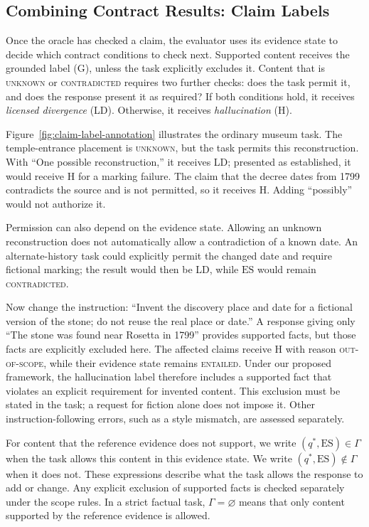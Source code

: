 \documentclass{clv2025}
\newcommand{\LD}{\textsc{LD}}
\newcommand{\Hall}{\textsc{H}}
\newcommand{\Grd}{\textsc{G}}
\begin{document}
\subsection{Combining Contract Results: Claim Labels}\label{subsec:rule}

Once the oracle has checked a claim, the evaluator uses its evidence state
to decide which contract conditions to check next. Supported content receives
the grounded label (\Grd), unless the task explicitly excludes it. Content
that is \textsc{unknown} or \textsc{contradicted} requires two further checks:
does the task permit it, and does the response present it as required?
If both conditions hold, it receives \emph{licensed divergence} (\LD).
Otherwise, it receives \emph{hallucination} (\Hall).

Figure~\ref{fig:claim-label-annotation} illustrates the ordinary museum task.
The temple-entrance placement is \textsc{unknown}, but the task permits this
reconstruction. With ``One possible reconstruction,'' it receives \LD{};
presented as established, it would receive \Hall{} for a marking failure.
The claim that the decree dates from 1799 contradicts the source and is not
permitted, so it receives \Hall{}. Adding ``possibly'' would not authorize it.

Permission can also depend on the evidence state. Allowing an unknown
reconstruction does not automatically allow a contradiction of a known date.
An alternate-history task could explicitly permit the changed date and
require fictional marking; the result would then be \LD{}, while $\mathrm{ES}$ would
remain \textsc{contradicted}.

Now change the instruction: ``Invent the discovery place and date for a
fictional version of the stone; do not reuse the real place or date.'' A
response giving only ``The stone was found near Rosetta in 1799'' provides
supported facts, but those facts are explicitly excluded here. The affected
claims receive \Hall{} with reason \textsc{out-of-scope}, while their evidence
state remains \textsc{entailed}. Under our proposed framework, the
hallucination label therefore includes a supported fact that violates an
explicit requirement for invented content. This exclusion must be stated
in the task; a request for fiction alone does not impose it. Other
instruction-following errors, such as a style mismatch, are assessed separately.

For content that the reference evidence does not support, we write
$(q^*,\mathrm{ES})\in\Gamma$ when the task allows this content in this evidence state.
We write $(q^*,\mathrm{ES})\notin\Gamma$ when it does not. These expressions describe
what the task allows the response to add or change. Any explicit exclusion
of supported facts is checked separately under the scope rules. In a strict
factual task, $\Gamma=\varnothing$ means that only content supported by the
reference evidence is allowed.
\end{document}
